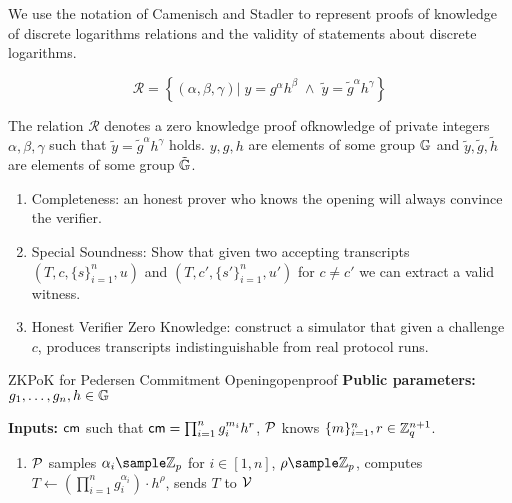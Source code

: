 {We use the notation of Camenisch and Stadler to represent proofs of knowledge of discrete logarithms relations and the validity of statements about discrete logarithms. 

\[
    \mathcal{R} = \left\{ (\alpha, \beta, \gamma) | \; y = g^{\alpha}h^{\beta} \; \wedge \; \tilde{y} = \tilde{g}^{\alpha}h^{\gamma} \right\}
\]

The relation $\mathcal{R}$ denotes a zero knowledge proof ofknowledge of private integers $\alpha, \beta, \gamma$ such that $\tilde{y} = \tilde{g}^{\alpha}h^{\gamma}$ holds. $y, g, h$ are elements of some group $\mathbb{G}$ and $\tilde{y}, \tilde{g}, \tilde{h}$ are elements of some group $\tilde{\mathbb{G}}$. 





\begin{enumerate}
    \item Completeness: an honest prover who knows the opening will always convince the verifier.
    
    \item Special Soundness: Show that given two accepting transcripts $(T, c, \{s\}_{i=1}^n, u)$ and $(T, c', \{s'\}_{i=1}^n, u')$ for $c \neq c'$ we can extract a valid witness.
    
    \item Honest Verifier Zero Knowledge: construct a simulator that given a challenge $c$, produces transcripts indistinguishable from real protocol runs.
\end{enumerate}










\newpage

\begin{protocol}{ZKPoK for Pedersen Commitment Opening}{openproof}
    \vspace{1em}
    \textbf{Public parameters:}  $g_1, \dots, g_n, h \in \mathbb{G}$

    \textbf{Inputs:} $\mathsf{cm}$ such that $\mathsf{cm} = \prod_{i=1}^ng_i^{m_i}h^r$, \;    $\mathcal{P}$ knows $\{m\}_{i=1}^n, r \in \mathbb{Z}_q^{n+1}$.

    \vspace{1em}

    \begin{enumerate}
        \item $\mathcal{P}$ samples $\alpha_i \sample \Z_p$ for $i \in [1,n]$, $\rho \sample \Z_p$, computes $T \gets (\prod_{i=1}^ng_i^{\alpha_i})\cdot h^{\rho}$, sends $T$ to $\mathcal{V}$
        

\end{enumerate}
\end{protocol}}
